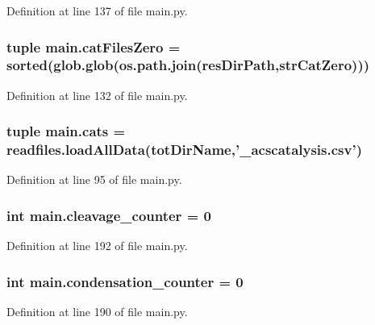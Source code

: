 Definition at line 137 of file main.\-py.

\hypertarget{a00122_a7ab6089d577bd60acf22b92e84930523}{
\subsubsection[{cat\-Files\-Zero}]{\setlength{\rightskip}{0pt plus 5cm}tuple main.\-cat\-Files\-Zero = sorted(glob.\-glob(os.\-path.\-join({\bf res\-Dir\-Path},{\bf str\-Cat\-Zero})))}}\label{a00122_a7ab6089d577bd60acf22b92e84930523}


Definition at line 132 of file main.\-py.

\hypertarget{a00122_adc0282a6415a88834556e66807bcc800}{
\subsubsection[{cats}]{\setlength{\rightskip}{0pt plus 5cm}tuple main.\-cats = readfiles.\-load\-All\-Data({\bf tot\-Dir\-Name},'\-\_\-acscatalysis.\-csv')}}\label{a00122_adc0282a6415a88834556e66807bcc800}


Definition at line 95 of file main.\-py.

\hypertarget{a00122_aba28788973ae3e9140b53078efe5d204}{
\subsubsection[{cleavage\-\_\-counter}]{\setlength{\rightskip}{0pt plus 5cm}int main.\-cleavage\-\_\-counter = 0}}\label{a00122_aba28788973ae3e9140b53078efe5d204}


Definition at line 192 of file main.\-py.

\hypertarget{a00122_a358b60986e7e25df0dfb61562b7aa3e2}{
\subsubsection[{condensation\-\_\-counter}]{\setlength{\rightskip}{0pt plus 5cm}int main.\-condensation\-\_\-counter = 0}}\label{a00122_a358b60986e7e25df0dfb61562b7aa3e2}


Definition at line 190 of file main.\-py.

